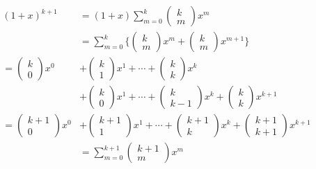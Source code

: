 \documentclass{bxjsarticle}
\begin{document}
\begin{align*}
(1+x)^{k+1} &= (1+x)\sum_{m=0}^k{\left(\begin{array}{ll} k \\ m \end{array} \right)x^m} \\
            &= \sum_{m=0}^k{\Biggl\{\left(\begin{array}{ll} k \\ m \end{array} \right)x^m+\left(\begin{array}{ll} k \\ m \end{array} \right)x^{m+1}\Biggr\}} \\
            = \left(\begin{array}{ll} k \\ 0 \end{array} \right)x^0 &+ \left(\begin{array}{ll} k \\ 1 \end{array} \right)x^1 + \cdots + \left(\begin{array}{ll} k \\ k \end{array} \right)x^k \\
            &+ \left(\begin{array}{ll} k \\ 0 \end{array} \right)x^1 + \cdots + \left(\begin{array}{ll} k \\ k-1 \end{array} \right)x^k + \left(\begin{array}{ll} k \\ k \end{array} \right)x^{k+1} \\
            = \left(\begin{array}{ll} k+1 \\ 0 \end{array} \right)x^0 &+ \left(\begin{array}{ll} k+1 \\ 1 \end{array} \right)x^1 + \cdots + \left(\begin{array}{ll} k+1 \\ k \end{array} \right)x^k + \left(\begin{array}{ll} k+1 \\ k+1 \end{array} \right)x^{k+1} \\
            &= \sum_{m=0}^{k+1}{\left(\begin{array}{ll} k+1 \\ m \end{array} \right)x^m}
\end{align*}
\end{document}
